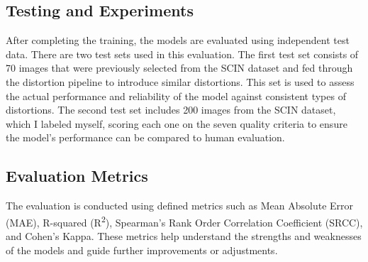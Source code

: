 \subsection{Testing and Experiments}
\label{sub:TestExperiment}
After completing the training, the models are evaluated using independent test data. There are two test sets used in this evaluation. The first test set consists of 70 images that were previously selected from the SCIN dataset and fed through the distortion pipeline to introduce similar distortions. This set is used to assess the actual performance and reliability of the model against consistent types of distortions. The second test set includes 200 images from the SCIN dataset, which I labeled myself, scoring each one on the seven quality criteria to ensure the model’s performance can be compared to human evaluation. \par 

\subsection{Evaluation Metrics}
\label{sub:EvaluationMetrics}
The evaluation is conducted using defined metrics such as Mean Absolute Error (MAE), R-squared (R\textsuperscript{2}), Spearman’s Rank Order Correlation Coefficient (SRCC), and Cohen’s Kappa. These metrics help understand the strengths and weaknesses of the models and guide further improvements or adjustments. \par
